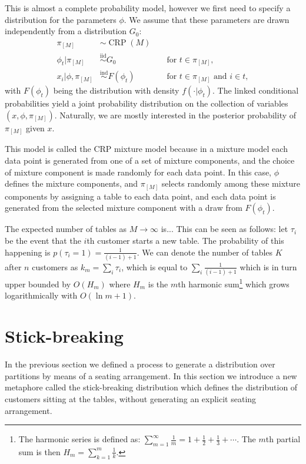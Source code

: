 This is almost a complete probability model, however we first need to specify a distribution for the parameters $\phi$. We assume that these parameters are drawn independently from a distribution $G_0$:
\begin{align}
	\pi_{[M]} &\sim \operatorname{CRP}(M)\label{eq:CRPMMpartition} \\
    \phi_t | \pi_{[M]} &\overset{\text{iid}}{\sim} G_0 && \text{ for }t\in\pi_{[M]},\label{eq:CRPMMlatent} \\
    x_i|\phi,\pi_{[M]} &\overset{\text{ind}}{\sim} F(\phi_t) && \text{ for }t\in\pi_{[M]}\text{ and }i\in t,\label{eq:CRPMMdatapoints}
\end{align}
with $F(\phi_t)$ being the distribution with density $f(\cdot|\phi_t)$. The linked conditional probabilities yield a joint probability distribution on the collection of variables $(x,\phi,\pi_{[M]})$. Naturally, we are mostly interested in the posterior probability of $\pi_{[M]}$ given $x$.

This model is called the CRP mixture model because in a mixture model each data point is generated from one of a set of mixture components, and the choice of mixture component is made randomly for each data point. In this case, $\phi$ defines the mixture components, and $\pi_{[M]}$ selects randomly among these mixture components by assigning a table to each data point, and each data point is generated from the selected mixture component with a draw from $F(\phi_t)$.

The expected number of tables as $M \rightarrow \infty$ is... This can be seen as follows: let $\tau_i$ be the event that the $i$th customer starts a new table. The probability of this happening is $p(\tau_i = 1) = \frac{1}{(i-1)+1}$. We can denote the number of tables $K$ after $n$ customers as $k_m = \sum_i \tau_i$, which is equal to $\sum_i \frac{1}{(i-1)+1}$ which is in turn upper bounded by $O(H_m)$ where $H_m$ is the $m$th harmonic sum\footnote{The harmonic series is defined as: $\sum_{m=1}^\infty \frac{1}{m} = 1 + \frac{1}{2} + \frac{1}{3} + \cdots$. The $m$th partial sum is then $H_m=\sum_{k=1}^m \frac{1}{k}$.} which grows logarithmically with $O(\ln m+1)$. 



\section{Stick-breaking}
In the previous section we defined a process to generate a distribution over partitions by means of a seating arrangement. In this section we introduce a new metaphore called the stick-breaking distribution which defines the distribution of customers sitting at the tables, without generating an explicit seating arrangement.

